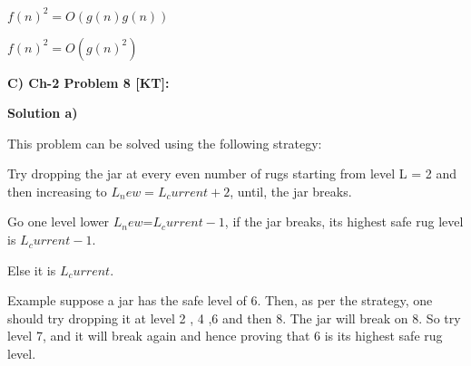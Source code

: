 \documentclass[letterpaper,portrait,12pt]{article}
\begin{document}
\begin{flushleft}
$f(n) ^2 = O(g(n)g(n))
$
\end{flushleft}


\begin{flushleft}
$f(n) ^2 = O(g(n)^2)
$
\end{flushleft}


\begin{flushleft}

\end{flushleft}


\begin{flushleft}
\textbf{C) Ch-2 Problem 8 [KT]:}
\end{flushleft}


\begin{flushleft}

\end{flushleft}


\begin{flushleft}
\textbf{Solution a)}
\end{flushleft}


\begin{flushleft}
This problem can be solved using the following strategy:
\end{flushleft}


\begin{flushleft}
Try dropping the jar at every even number of rugs starting from level L = 2 and then increasing to $L_new=L_current+2$, until, the jar breaks.
\end{flushleft}


\begin{flushleft}
Go one level lower $L_new$=$L_current-1$, if the jar breaks, its highest safe rug level is $L_current-1.$
\end{flushleft}


\begin{flushleft}
		Else it is $L_current$.
\end{flushleft}


\begin{flushleft}

\end{flushleft}


\begin{flushleft}
Example suppose a jar has the safe level of 6. Then, as per the strategy, one should try dropping it at level 2 , 4 ,6 and then 8. The jar will break on 8. So try level 7, and it will break again and hence proving that 6 is its highest safe rug level.
\end{flushleft}
\end{document}
